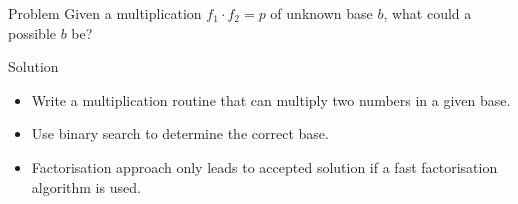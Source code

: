 \begin{slide}
  \begin{block}{Problem}
    Given a multiplication $f_1 \cdot f_2 = p$ of unknown base $b$, what could a possible $b$ be?
  \end{block}
  \begin{block}{Solution}
    \begin{itemize} 
      \item Write a multiplication routine that can multiply two numbers in a given base.
      \item Use binary search to determine the correct base.
      \pause
      \item Factorisation approach only leads to accepted solution if a fast factorisation algorithm is used.
    \end{itemize}
  \end{block}
\end{slide}
